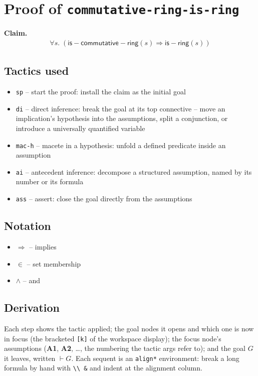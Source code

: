 \documentclass[11pt]{article}
\begin{document}
\section*{Proof of \texttt{commutative-ring-is-ring}}
\textbf{Claim.}
\begin{align*}
  \forall s.\; (\mathsf{is{-}commutative{-}ring}(s) \Rightarrow \mathsf{is{-}ring}(s))
\end{align*}
\bigskip

\subsection*{Tactics used}
\begin{itemize}
\item \texttt{sp} -- start the proof: install the claim as the initial goal
\item \texttt{di} -- direct inference: break the goal at its top connective -- move an implication's hypothesis into the assumptions, split a conjunction, or introduce a universally quantified variable
\item \texttt{mac-h} -- macete in a hypothesis: unfold a defined predicate inside an assumption
\item \texttt{ai} -- antecedent inference: decompose a structured assumption, named by its number or its formula
\item \texttt{ass} -- assert: close the goal directly from the assumptions
\end{itemize}

\subsection*{Notation}
\begin{itemize}
\item $\Rightarrow$ -- implies
\item $\in$ -- set membership
\item $\wedge$ -- and
\end{itemize}

\subsection*{Derivation}
Each step shows the tactic applied; the goal nodes it opens and which one is now in focus (the bracketed \texttt{[k]} of the workspace display); the focus node's assumptions (\textbf{A1}, \textbf{A2}, \dots{}, the numbering the tactic args refer to); and the goal $G$ it leaves, written $\vdash G$.  Each sequent is an \texttt{align*} environment: break a long formula by hand with \texttt{\textbackslash\textbackslash\ \&} and indent at the alignment column.
\end{document}
